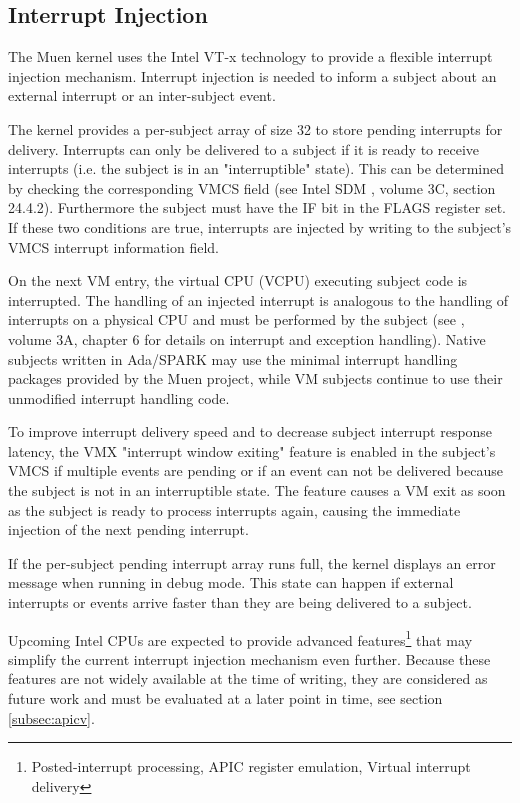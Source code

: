\subsection{Interrupt Injection}\label{subsec:int-injection}
The Muen kernel uses the Intel VT-x technology to provide a flexible interrupt
injection mechanism. Interrupt injection is needed to inform a subject about an
external interrupt or an inter-subject event.

The kernel provides a per-subject array of size 32 to store pending interrupts
for delivery.  Interrupts can only be delivered to a subject if it is ready to
receive interrupts (i.e. the subject is in an "interruptible" state). This can
be determined by checking the corresponding VMCS field (see Intel SDM
\cite{IntelSDM}, volume 3C, section 24.4.2). Furthermore the subject must have
the IF bit in the FLAGS register set. If these two conditions are true,
interrupts are injected by writing to the subject's VMCS interrupt information
field.

On the next VM entry, the virtual CPU (VCPU) executing subject code
is interrupted. The handling of an injected interrupt is analogous to the
handling of interrupts on a physical CPU and must be performed by the subject
(see \cite{IntelSDM}, volume 3A, chapter 6 for details on interrupt and
exception handling). Native subjects written in Ada/SPARK may use the minimal
interrupt handling packages provided by the Muen project, while VM subjects
continue to use their unmodified interrupt handling code.

To improve interrupt delivery speed and to decrease subject interrupt response
latency, the VMX "interrupt window exiting" feature is enabled in the subject's
VMCS if multiple events are pending or if an event can not be delivered because
the subject is not in an interruptible state. The feature causes a VM exit as
soon as the subject is ready to process interrupts again, causing the immediate
injection of the next pending interrupt.

If the per-subject pending interrupt array runs full, the kernel displays an
error message when running in debug mode. This state can happen if external
interrupts or events arrive faster than they are being delivered to a subject.

Upcoming Intel CPUs are expected to provide advanced
features\footnote{Posted-interrupt processing, APIC register emulation, Virtual
interrupt delivery} that may simplify the current interrupt injection mechanism
even further. Because these features are not widely available at the time of
writing, they are considered as future work and must be evaluated at a later
point in time, see section \ref{subsec:apicv}.
